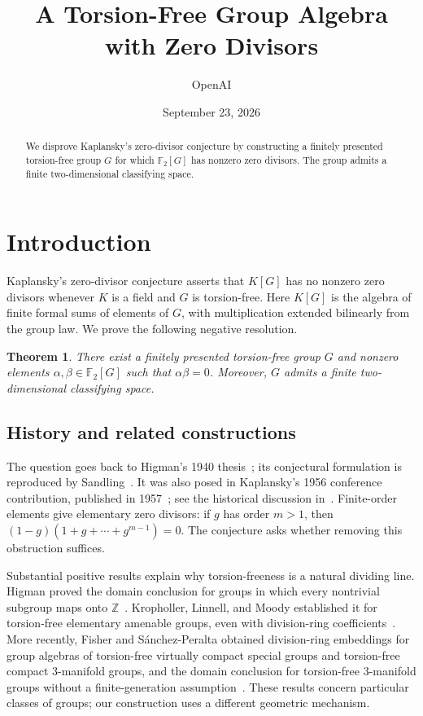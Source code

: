 \documentclass[11pt]{article}
\title{A Torsion-Free Group Algebra with Zero Divisors}
\author{OpenAI}
\date{September 23, 2026}
\newtheorem{theorem}{Theorem}[section]
\theoremstyle{definition}
\numberwithin{equation}{section}
\begin{document}
\maketitle
\begin{abstract}
We disprove Kaplansky's zero-divisor conjecture by constructing a finitely presented torsion-free group \(G\) for which \(\mathbb F_2[G]\) has nonzero zero divisors. The group admits a finite two-dimensional classifying space.
\end{abstract}

\section{Introduction}\label{sec:introduction}

Kaplansky's zero-divisor conjecture asserts that \(K[G]\) has no nonzero zero divisors whenever \(K\) is a field and \(G\) is torsion-free. Here \(K[G]\) is the algebra of finite formal sums of elements of \(G\), with multiplication extended bilinearly from the group law. We prove the following negative resolution.

\begin{theorem}\label{thm:main}
There exist a finitely presented torsion-free group \(G\) and nonzero elements
\(\alpha,\beta\in\mathbb F_2[G]\) such that \(\alpha\beta=0\).
Moreover, \(G\) admits a finite two-dimensional classifying space.
\end{theorem}

\subsection*{History and related constructions}

The question goes back to Higman's 1940 thesis~\cite{Higman1940Thesis}; its conjectural formulation is reproduced by Sandling~\cite[p.~112]{Sandling1981}. It was also posed in Kaplansky's 1956 conference contribution, published in 1957~\cite[Problem~6]{Kaplansky1957}; see the historical discussion in~\cite{Gardam2021}. Finite-order elements give elementary zero divisors: if \(g\) has order \(m>1\), then \((1-g)(1+g+\cdots+g^{m-1})=0\). The conjecture asks whether removing this obstruction suffices.

Substantial positive results explain why torsion-freeness is a natural dividing line. Higman proved the domain conclusion for groups in which every nontrivial subgroup maps onto \(\mathbb Z\)~\cite[Section~4, Theorems~12--13]{Higman1940}. Kropholler, Linnell, and Moody established it for torsion-free elementary amenable groups, even with division-ring coefficients~\cite[Theorem~1.4]{KrophollerLinnellMoody1988}. More recently, Fisher and S\'anchez-Peralta obtained division-ring embeddings for group algebras of torsion-free virtually compact special groups and torsion-free compact \(3\)-manifold groups, and the domain conclusion for torsion-free \(3\)-manifold groups without a finite-generation assumption~\cite[Theorem~1.3 and Corollary~1.5]{FisherSanchezPeralta2026}. These results concern particular classes of groups; our construction uses a different geometric mechanism.
\end{document}
